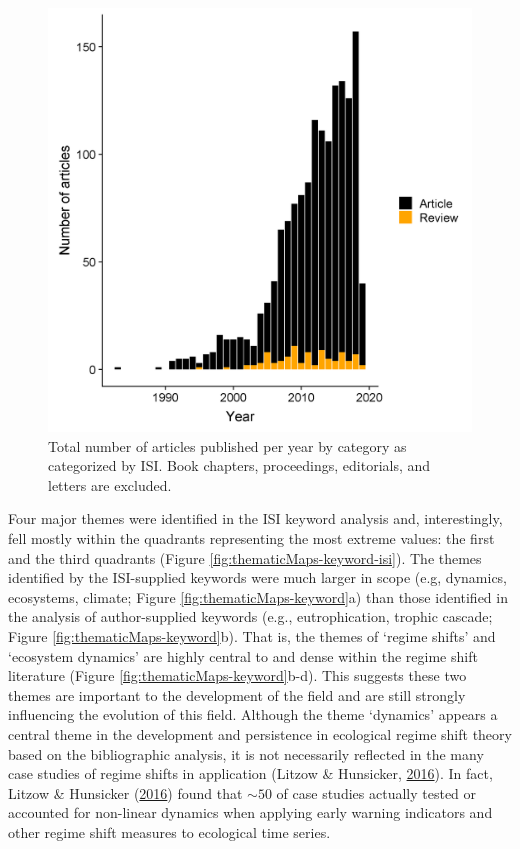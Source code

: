 \documentclass[print]{nuthesis}
\begin{document}
\begin{figure}
\includegraphics[width=0.85\linewidth]{./chapterFiles/rdmReview/figures/figsCalledInDiss/revArtNums} \caption{Total number of articles published per year by category as categorized by ISI. Book chapters, proceedings, editorials, and letters are excluded.}\label{fig:revArtNums}
\end{figure}
Four major themes were identified in the ISI keyword analysis and, interestingly, fell mostly within the quadrants representing the most extreme values: the first and the third quadrants (Figure \ref{fig:thematicMaps-keyword-isi}). The themes identified by the ISI-supplied keywords were much larger in scope (e.g, dynamics, ecosystems, climate; Figure \ref{fig:thematicMaps-keyword}a) than those identified in the analysis of author-supplied keywords (e.g., eutrophication, trophic cascade; Figure \ref{fig:thematicMaps-keyword}b). That is, the themes of `regime shifts' and `ecosystem dynamics' are highly central to and dense within the regime shift literature (Figure \ref{fig:thematicMaps-keyword}b-d). This suggests these two themes are important to the development of the field and are still strongly influencing the evolution of this field. Although the theme `dynamics' appears a central theme in the development and persistence in ecological regime shift theory based on the bibliographic analysis, it is not necessarily reflected in the many case studies of regime shifts in application (Litzow \& Hunsicker, \protect\hyperlink{ref-litzow_early_2016}{2016}). In fact, Litzow \& Hunsicker (\protect\hyperlink{ref-litzow_early_2016}{2016}) found that \(\sim50%
\) of case studies actually tested or accounted for non-linear dynamics when applying early warning indicators and other regime shift measures to ecological time series.
\end{document}
